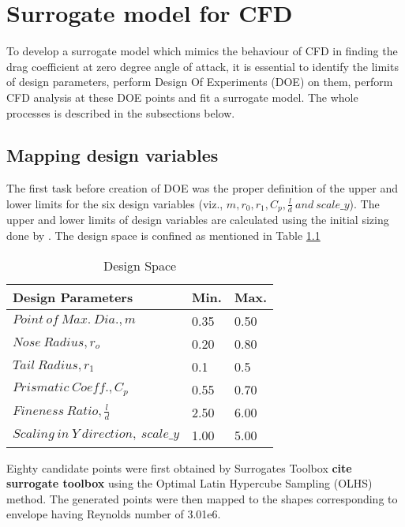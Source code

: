 \chapter{Surrogate model for CFD}
\label{Surrogate model for CFD}
To develop a surrogate model which mimics the behaviour of CFD in finding the drag coefficient at zero degree angle of attack, it is essential to identify the limits of design parameters, perform Design Of Experiments (DOE) on them, perform CFD analysis at these DOE points and fit a surrogate model. The whole processes is described in the subsections below.

\section{Mapping design variables}
The first task before creation of DOE was the proper definition of the upper and lower limits for the six design variables (viz., $ m, r_0, r_1, C_p, \frac{l}{d} \ and \  scale \_y $). The upper and lower limits of design variables are calculated using the initial sizing done by \cite{alam2017thesis}. The design space is confined as mentioned in Table \ref{Degign space }

\begin{table}[H]
	\centering
	\caption{Design Space}
	\label{Degign space }
	\begin{tabular}{lll}
		\hline \hline
		Design Parameters & Min. & Max.    \\ \hline \hline
		
		$ Point\ of\ Max.\ Dia., m$ & 0.35 & 0.50     \\  
		$ Nose\ Radius, r _{o} $ & 0.20 & 0.80     \\
		$ Tail\ Radius, r _{1} $ & 0.1 & 0.5     \\  
		$ Prismatic\ Coeff., C _{p }$ & 0.55 & 0.70 \\
		$ Fineness\ Ratio, \frac{l}{d} $ &2.50 & 6.00 \\
		$Scaling\ in\ Y\ direction,\ scale\_y$ &1.00 & 5.00\\ \hline \hline
	\end{tabular}
\end{table}

Eighty candidate points were first obtained by Surrogates Toolbox \textbf{cite surrogate toolbox} using the Optimal Latin Hypercube Sampling (OLHS) method. The generated points were then mapped to the shapes corresponding to envelope having Reynolds number of 3.01e6.


